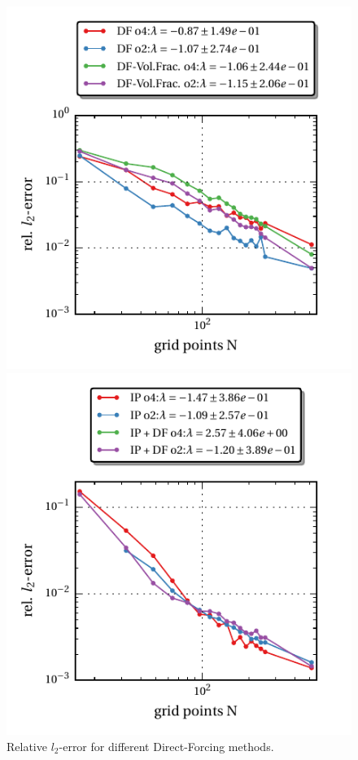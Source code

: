 \begin{figure}[!bp]
\begin{minipage}[c]{0.5\textwidth}
      \includegraphics{gfx/immersed_boundary/tcflow/theo/df.pdf}
      \caption{Relative $l_2$-error for different Direct-Forcing methods.}
  \end{minipage}
  \begin{minipage}[c]{0.5\textwidth}
      \includegraphics{gfx/immersed_boundary/tcflow/theo/ip.pdf}

\end{minipage}
\end{figure}
